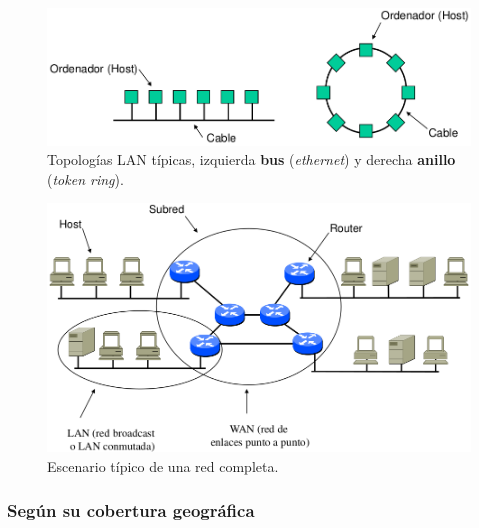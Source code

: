 \documentclass[10pt,a4paper]{article}
\begin{document}
\begin{figure}
  \caption{Topologías LAN típicas, izquierda \textbf{bus} (\textit{ethernet}) y derecha \textbf{anillo} (\textit{token ring}).}
  \label{fig:topologia_lan}  
  \centering
  \hbox{\includegraphics[width=0.5\textwidth-\fboxrule-\fboxrule]{imgs/topologia_lan.png}}  
\end{figure}

\begin{figure}
  \caption{Escenario típico de una red completa.}
  \label{fig:escenario_lan_wan}  
  \centering
  \hbox{\includegraphics[width=0.5\textwidth-\fboxrule-\fboxrule]{imgs/escenario_lan_wan.png}}  
\end{figure}

\subsubsection{Según su cobertura geográfica}
\end{document}
